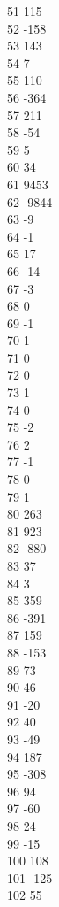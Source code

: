 { 51	115 \\
 52	-158 \\
 53	143 \\
 54	7 \\
 55	110 \\
 56	-364 \\
 57	211 \\
 58	-54 \\
 59	5 \\
 60	34 \\
 61	9453 \\
 62	-9844 \\
 63	-9 \\
 64	-1 \\
 65	17 \\
 66	-14 \\
 67	-3 \\
 68	0 \\
 69	-1 \\
 70	1 \\
 71	0 \\
 72	0 \\
 73	1 \\
 74	0 \\
 75	-2 \\
 76	2 \\
 77	-1 \\
 78	0 \\
 79	1 \\
 80	263 \\
 81	923 \\
 82	-880 \\
 83	37 \\
 84	3 \\
 85	359 \\
 86	-391 \\
 87	159 \\
 88	-153 \\
 89	73 \\
 90	46 \\
 91	-20 \\
 92	40 \\
 93	-49 \\
 94	187 \\
 95	-308 \\
 96	94 \\
 97	-60 \\
 98	24 \\
 99	-15 \\
 100	108 \\
 101	-125 \\
 102	55 \\
}
